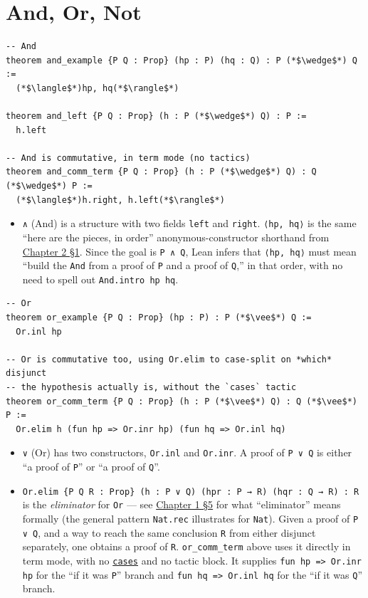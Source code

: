 \section{And, Or, Not}\label{sec:03-propositions-and-proofs:05-and-or-not:1}

\begin{lstlisting}
-- And
theorem and_example {P Q : Prop} (hp : P) (hq : Q) : P (*$\wedge$*) Q :=
  (*$\langle$*)hp, hq(*$\rangle$*)

theorem and_left {P Q : Prop} (h : P (*$\wedge$*) Q) : P :=
  h.left

-- And is commutative, in term mode (no tactics)
theorem and_comm_term {P Q : Prop} (h : P (*$\wedge$*) Q) : Q (*$\wedge$*) P :=
  (*$\langle$*)h.right, h.left(*$\rangle$*)
\end{lstlisting}

\begin{itemize}
\tightlist
\item
  \texttt{∧} (And) is a structure with two fields \texttt{left} and \texttt{right}. \texttt{⟨hp, hq⟩} is the same ``here are the pieces, in order'' anonymous-constructor shorthand from \hyperref[sec:02-functions-and-structures:01-structure-basics:1]{Chapter 2 §1}. Since the goal is \texttt{P ∧ Q}, Lean infers that \texttt{⟨hp, hq⟩} must mean ``build the \texttt{And} from a proof of \texttt{P} and a proof of \texttt{Q},'' in that order, with no need to spell out \texttt{And.intro hp hq}.
\end{itemize}

\begin{lstlisting}
-- Or
theorem or_example {P Q : Prop} (hp : P) : P (*$\vee$*) Q :=
  Or.inl hp

-- Or is commutative too, using Or.elim to case-split on *which* disjunct
-- the hypothesis actually is, without the `cases` tactic
theorem or_comm_term {P Q : Prop} (h : P (*$\vee$*) Q) : Q (*$\vee$*) P :=
  Or.elim h (fun hp => Or.inr hp) (fun hq => Or.inl hq)
\end{lstlisting}

\begin{itemize}
\tightlist
\item
  \texttt{∨} (Or) has two constructors, \texttt{Or.inl} and \texttt{Or.inr}. A proof of \texttt{P ∨ Q} is either ``a proof of \texttt{P}'' or ``a proof of \texttt{Q}''.
\item
  \texttt{Or.elim \{P Q R : Prop\} (h : P ∨ Q) (hpr : P → R) (hqr : Q → R) : R} is the \emph{eliminator} for \texttt{Or} --- see \hyperref[sec:01-basics:05-pi-sigma-and-coc:1]{Chapter 1 §5} for what ``eliminator'' means formally (the general pattern \texttt{Nat.rec} illustrates for \texttt{Nat}). Given a proof of \texttt{P ∨ Q}, and a way to reach the same conclusion \texttt{R} from either disjunct separately, one obtains a proof of \texttt{R}. \texttt{or\_\allowbreak{}comm\_\allowbreak{}term} above uses it directly in term mode, with no \href{https://lean-lang.org/doc/reference/latest/Tactic-Proofs/Tactic-Reference/}{\texttt{cases}} and no tactic block. It supplies \texttt{fun hp => Or.inr hp} for the ``if it was \texttt{P}'' branch and \texttt{fun hq => Or.inl hq} for the ``if it was \texttt{Q}'' branch.
\end{itemize}

